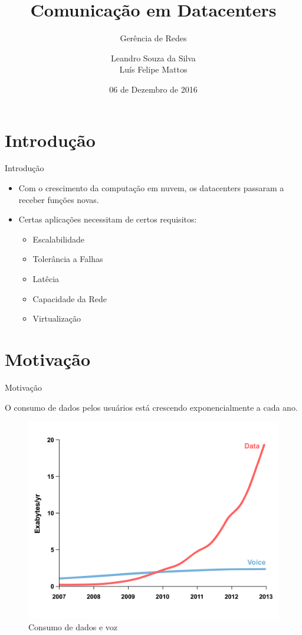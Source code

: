 \documentclass[aspectratio=169]{beamer}
\title{Comunicação em Datacenters}
\subtitle{Gerência de Redes}
\author[Leandro Silva, Luís Felipe] %
{Leandro Souza da  Silva \\ Luís Felipe Mattos}
\institute{IC - Unicamp}
\date{ 06 de Dezembro de 2016 }
\begin{document}
\frame{\titlepage}

\section{Introdução}
	\begin{frame} {Introdução}
	
		
	 \begin{itemize}
	 \setlength\itemsep{2em}
	 	\Large
	 	\item
	 		Com o crescimento da computação em nuvem, os datacenters passaram a receber funções novas.
	 		
	 \item
	  	Certas aplicações necessitam de certos requisitos:
	  	\begin{itemize}
	 		\item
	 			Escalabilidade
	 	
			\item
			 	Tolerância a Falhas
			\item
			 	Latêcia
			 	
			 \item
			 	Capacidade da Rede
			 \item
			 	Virtualização	 			
	 	\end{itemize}
	 		 	
	 \end{itemize}
		
	\end{frame}



\section{Motivação} 

	\begin{frame} {Motivação}
			
			\centering
			\Large
				 O consumo de dados pelos usuários está crescendo exponencialmente a cada ano.
				\begin{figure}[ht]    
				    \includegraphics[scale=0.3]{consumo.png}
				    \caption{Consumo de dados e voz}
				    \label{fig:sample_figure}
				\end{figure}

	\end{frame}
	
\end{document}

